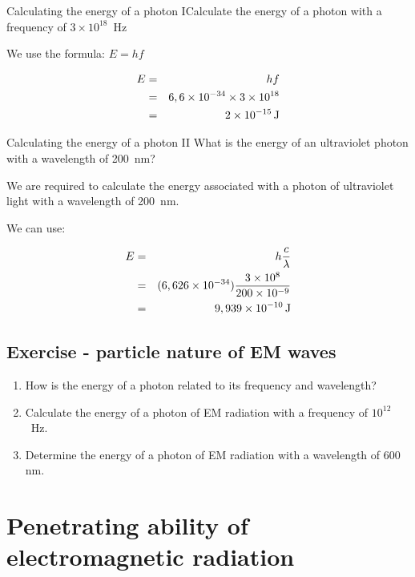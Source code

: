 \begin{wex}{Calculating the energy of a photon I}{Calculate the energy of a photon with a frequency of $3 \times 10^{18}$~Hz}
{
We use the formula: $E=hf$

\begin{eqnarray*}
E &=& hf\\
&=& 6,6 \times 10^{-34} \times 3 \times 10^{18}\\
&=& 2 \times 10^{-15} \,\mathrm{J}\\
\end{eqnarray*}}
\end{wex}

\begin{wex}{Calculating the energy of a photon II}
{What is the energy of an ultraviolet photon with a wavelength of 200~nm?}
{
We are required to calculate the energy associated with a photon of ultraviolet light with a wavelength of  200~nm.

We can use:

\begin{eqnarray*}
E & = & h\frac{c}{\lambda}\\
& = & (6,626 \times 10^{-34})\frac{3\times10^{8}}{200\times 10^{-9}}\\
& = & 9,939 \times 10^{-10}\,\mathrm{J}
\end{eqnarray*}}
\end{wex}


\subsection {Exercise - particle nature of EM waves}
\begin{enumerate}
\item How is the energy of a photon related to its frequency and wavelength?
\item Calculate the energy of a photon of EM radiation with a frequency of $10^{12}$~Hz.
\item Determine the energy of a photon of EM radiation with a wavelength of 600 nm.
\end{enumerate}

\section{Penetrating ability of electromagnetic radiation}
\label{p:em:emr12:pa}

